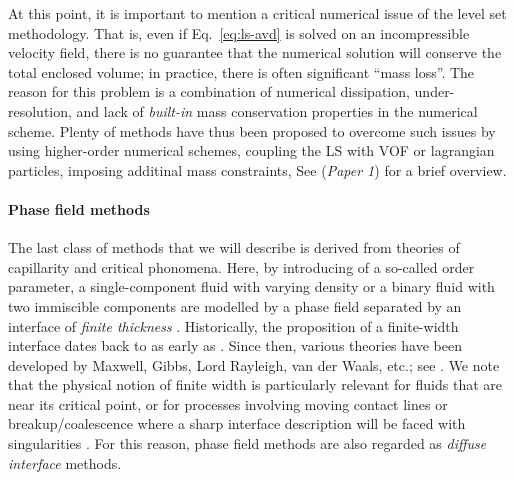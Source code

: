 At this point, it is important to mention a critical numerical issue of the level set methodology. That is, even if Eq.\ \eqref{eq:ls-avd} is solved on an incompressible velocity field, there is no guarantee that the numerical solution will conserve the total enclosed volume; in practice, there is often significant ``mass loss''.
The reason for this problem is a combination of numerical dissipation, under-resolution, and lack of \emph{built-in} mass conservation properties in the numerical scheme.
Plenty of methods have thus been proposed to overcome such issues by using higher-order numerical schemes, coupling the LS with VOF or lagrangian particles, imposing additinal mass constraints, \etc See \cite{ICLS} (\emph{Paper 1}) for a brief overview.


\medskip
\paragraph{\bf Phase field methods}

The last class of methods that we will describe is derived from theories of capillarity and critical phonomena.
Here, by introducing of a so-called order parameter, a single-component fluid with varying density or a binary fluid with two immiscible components are modelled by a phase field separated by an interface of \emph{finite thickness} \citep{Anderson_McFadden_Wheeler}.
Historically, the proposition of a finite-width interface dates back to as early as \cite{Poisson1831}. Since then, various theories have been developed by Maxwell, Gibbs, Lord Rayleigh, van der Waals, etc.; see \eg \cite{van-der-waals1893, Cahn1961}.
We note that the physical notion of finite width is particularly relevant for fluids that are near its critical point, or for processes involving moving contact lines or breakup/coalescence where a sharp interface description will be faced with singularities \citep{Zhang_Mohseni_2018, Eggers1997}.
For this reason, phase field methods are also regarded as \emph{diffuse interface} methods.

